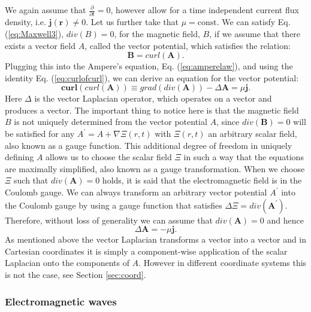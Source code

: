 We again assume that $\frac{\partial}{\partial t}=0$, however allow for a time
independent current flux density, i.e. $\mathbf{j}(\mathbf{r})\neq0$. Let us
further take that $\mu=\text{const}$. We can satisfy Eq. (\ref{eq:Maxwell3}),
$div(B)=0$, for the magnetic field, $B$, if we assume that there exists a
vector field $A$, called the vector potential, which satisfies the relation:
\[
\mathbf{B}=curl\left(  \mathbf{A}\right)  .
\]
Plugging this into the Ampere's equation, Eq. (\ref{eq:amperelaw}), and using
the identity Eq. (\ref{eq:curlofcurl}), we can derive an equation for the
vector potential:
\[
\mathbf{curl}(curl\left(  \mathbf{A}\right)  )\equiv grad\left(
div(\mathbf{A})\right)  -\Delta{\mathbf{A}}=\mu\mathbf{j}.
\]
Here $\Delta$ is the vector Laplacian operator, which operates on a vector and
produces a vector. The important thing to notice here is that the magnetic
field $B$ is not uniquely determined from the vector potential $A$, since
$div\left(  {\mathbf{B}}\right)  =0$ will be satisfied for any $A^{\prime
}=A+\nabla\Xi(r,t)$ with $\Xi(r,t)$ an arbitrary scalar field, also known as a
gauge function. This additional degree of freedom in uniquely defining $A$
allows us to choose the scalar field $\Xi$ in such a way that the equations
are maximally simplified, also known as a gauge transformation. When we choose
$\Xi$ such that $div\left(  \mathbf{A}\right)  =0$ holds, it is said that the
electromagnetic field is in the Coulomb gauge. We can always transform an
arbitrary vector potential $A^{\prime}$ into the Coulomb gauge by using a
gauge function that satisfies $\Delta\Xi=div\left(  \mathbf{A}^{\prime
}\right)  $. Therefore, without loss of generality we can assume that
$div\left(  \mathbf{A}\right)  =0$ and hence
\[
\Delta\mathbf{A}=-\mu\mathbf{j}.
\]
As mentioned above the vector Laplacian transforms a vector into a vector and
in Cartesian coordinates it is simply a component-wise application of the
scalar Laplacian onto the components of $A$. However in different coordinate
systems this is not the case, see Section \ref{sec:coord}.\newline 

\subsubsection{Electromagnetic waves\newline }

